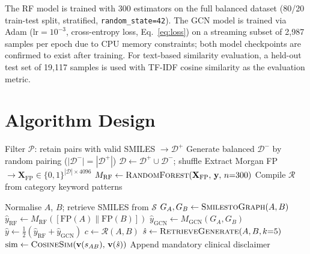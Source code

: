 \documentclass[conference]{IEEEtran}
\begin{document}
The RF model is trained with 300 estimators on the full balanced dataset (80/20 train-test
split, stratified, \texttt{random\_state=42}). The GCN model is trained via Adam
($\mathrm{lr}=10^{-3}$, cross-entropy loss, Eq.~\ref{eq:loss}) on a streaming subset
of 2,987 samples per epoch due to CPU memory constraints; both model checkpoints are
confirmed to exist after training. For text-based similarity evaluation, a held-out test
set of 19,117 samples is used with TF-IDF cosine similarity as the evaluation metric.

\section{Algorithm Design}
\label{sec:algo}

\begin{algorithm}[t]
\DontPrintSemicolon
\SetAlgoLined
{}
Filter $\mathcal{P}$: retain pairs with valid SMILES $\to \mathcal{D}^+$\;
Generate balanced $\mathcal{D}^-$ by random pairing ($|\mathcal{D}^-|=|\mathcal{D}^+|$)\;
$\mathcal{D} \gets \mathcal{D}^+ \cup \mathcal{D}^-$; shuffle\;
Extract Morgan FP $\to \mathbf{X}_{\mathrm{FP}} \in \{0,1\}^{|\mathcal{D}|\times4096}$\;
$M_{\mathrm{RF}} \gets \textsc{RandomForest}(\mathbf{X}_{\mathrm{FP}},\,\mathbf{y},\,n{=}300)$\;
Compile $\mathcal{R}$ from category keyword patterns\;
\caption{DDI Framework Training}
\label{alg:train}
\end{algorithm}

\begin{algorithm}[t]
\DontPrintSemicolon
\SetAlgoLined
{}
Normalise $A$, $B$; retrieve SMILES from $\mathcal{S}$\;
$G_A,G_B \gets \textsc{SmilestoGraph}(A,B)$\;
$\hat{y}_{\mathrm{RF}} \gets M_{\mathrm{RF}}([\mathrm{FP}(A)\|\mathrm{FP}(B)])$\;
$\hat{y}_{\mathrm{GCN}} \gets M_{\mathrm{GCN}}(G_A, G_B)$\;
$\hat{y} \gets \tfrac{1}{2}(\hat{y}_{\mathrm{RF}} + \hat{y}_{\mathrm{GCN}})$\;
$c \gets \mathcal{R}(A, B)$\;
$\hat{s} \gets \textsc{RetrieveGenerate}(A, B, k{=}5)$\;
$\mathrm{sim} \gets \textsc{CosineSim}(\mathbf{v}(s_{AB}),\,\mathbf{v}(\hat{s}))$\;
Append mandatory clinical disclaimer\;
\caption{Real-Time DDI Inference}
\label{alg:infer}
\end{algorithm}
\end{document}
